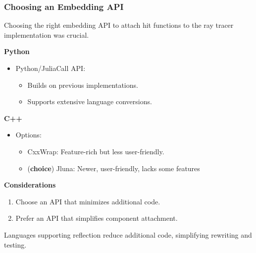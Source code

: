 
\begin{frame}
    \frametitle{Choosing an Embedding API}
    
    Choosing the right embedding API to attach hit functions to the ray tracer implementation was crucial.
    
    \pause
    
    \textbf{Python}
    \begin{itemize}
        \item Python/JuliaCall API:
        \begin{itemize}
            \item Builds on previous implementations.
            \item Supports extensive language conversions.
        \end{itemize}
    \end{itemize}
    
    \pause
    
    \textbf{C++}
    \begin{itemize}
        \item Options:
        \begin{itemize}
            \item CxxWrap: Feature-rich but less user-friendly.
            \item (\textbf{choice}) Jluna: Newer, user-friendly, lacks some features
        \end{itemize}
    \end{itemize}
    
    \pause
    
    \textbf{Considerations}
    \begin{enumerate}
        \item Choose an API that minimizes additional code.
        \item Prefer an API that simplifies component attachment.
    \end{enumerate}
    
    \pause
    
    Languages supporting reflection reduce additional code, simplifying rewriting and testing.
    
    \end{frame}